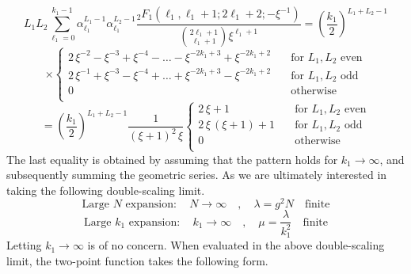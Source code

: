 \newpage
%
%
\begin{equation*}
L_1 L_2 \sum_{\ell_1 = 0}^{k_1 - 1}
\alpha_{\ell_1}^{L_1 - 1}
\alpha_{\ell_1}^{L_2 - 1}
\frac{{}_2 F_1(\ell_1, \ell_1 + 1; 2 \ell_1 + 2; -\xi^{-1})}{\binom{2 \ell_1 + 1}{\ell_1 + 1} \xi^{\ell_1+1}}
=
\left( \frac{k_1}{2} \right)^{L_1 + L_2 - 1}
\end{equation*}
%
%
\begin{equation*}
\times
\begin{cases}
		2 \, \xi^{-2} - \xi^{-3} + \xi^{-4} -
    	\ldots
    	- \xi^{-2 k_1 + 3} + \xi^{-2 k_1 + 2}
		& \quad \text{for } L_1,L_2 \text{ even} \\
		
    	2 \, \xi^{-1} + \xi^{-3} - \xi^{-4} +
    	\ldots
    	+ \xi^{-2 k_1 + 3} - \xi^{-2 k_1 + 2}
    	& \quad \text{for } L_1,L_2 \text{ odd} \\
    	0
    	& \quad \text{otherwise } \\
  \end{cases}
\end{equation*}
%
%
\begin{equation}
=
\left( \frac{k_1}{2} \right)^{L_1 + L_2 - 1}
\frac{1}{(\xi + 1)^2 \, \xi}
\begin{cases}
    	2 \, \xi + 1
		& \quad \text{for } L_1,L_2 \text{ even} \\
    	2 \, \xi \, (\xi + 1) + 1
    	& \quad \text{for } L_1,L_2 \text{ odd} \\
    	0
    	& \quad \text{otherwise } \\
\end{cases}
\end{equation}
%
%
The last equality is obtained by assuming that the pattern holds for $k_1 \to \infty$, and subsequently summing the geometric series. As we are ultimately interested in taking the following double-scaling limit.
%
%
\begin{equation}
\text{Large } N \text{ expansion} : \quad
N \to \infty
%
\quad , \quad
%
\lambda = g^2 N \quad \text{finite}
\end{equation}
%
%
\begin{equation}
\text{Large } k_1 \text{ expansion} : \quad
k_1 \to \infty
%
\quad , \quad
%
\mu = \frac{\lambda}{k_1^2} \quad \text{finite}
\end{equation}
%
%
Letting $k_1 \to \infty$ is of no concern. When evaluated in the above double-scaling limit, the two-point function takes the following form.
%
%
